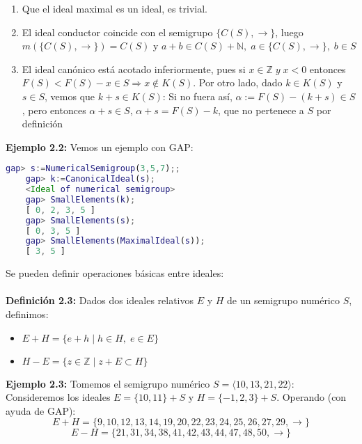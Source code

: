 \documentclass[11pt,spanish]{book}
\begin{document}
\begin{enumerate}
    \item Que el ideal maximal es un ideal, es trivial.
    \item El ideal conductor coincide con el semigrupo $\{C(S),\rightarrow\}$, luego $m(\{C(S),\rightarrow\}) = C(S)$ y $a+b\in C(S)+\mathbb{N},\;a\in \{C(S),\rightarrow\},\; b\in S$
    \item El ideal canónico está acotado inferiormente, pues si $x\in \mathbb{Z}\;y\; x<0$ entonces $F(S)<F(S)-x\in S\Rightarrow x\notin K(S)$. Por otro lado, dado $k\in K(S)$ y $s\in S$, vemos que $k+s\in K(S)$:
    Si no fuera así, $\alpha:=F(S)-(k+s)\in S$, pero entonces $\alpha+s\in S$, $\alpha+s=F(S)-k$, que no pertenece a $S$ por definición 
\end{enumerate}
\textbf{Ejemplo 2.2: } Vemos un ejemplo con GAP:
\begin{lstlisting}[language=gap]
    gap> s:=NumericalSemigroup(3,5,7);;
    gap> k:=CanonicalIdeal(s);
    <Ideal of numerical semigroup>
    gap> SmallElements(k);
    [ 0, 2, 3, 5 ]
    gap> SmallElements(s);
    [ 0, 3, 5 ]
    gap> SmallElements(MaximalIdeal(s));
    [ 3, 5 ]
\end{lstlisting}
Se pueden definir operaciones básicas entre ideales:\\
\\ \textbf{Definición 2.3: } Dados dos ideales relativos $E$ y $H$ de un semigrupo numérico $S$, definimos:
\begin{itemize}
    \item $E + H = \{e+h\;|\; h\in H,\; e\in E \}$
    \item $H-E = \{z\in\mathbb{Z}\;|\; z+E \subset H \}$
\end{itemize}
\textbf{Ejemplo 2.3:} Tomemos el semigrupo numérico $S=\langle 10, 13, 21, 22\rangle$:\\

Consideremos los ideales $E = \{10,11\}+S$ y $H=\{-1,2,3\}+S$. Operando (con ayuda de GAP):\\ $$E+H=\{9, 10, 12, 13, 14, 19, 20, 22, 23, 24, 25, 26, 27, 29, \rightarrow\}$$
$$E-H=\{21, 31, 34, 38, 41, 42, 43, 44, 47, 48, 50,\rightarrow\}$$
\end{document}
